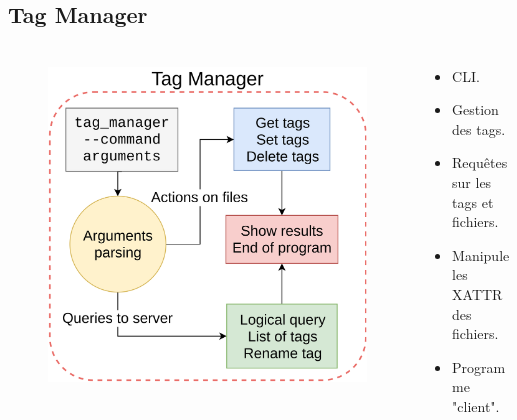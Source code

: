 \documentclass[10pt]{beamer}
\begin{document}
\subsection{Tag Manager}
\begin{frame}
    \frametitle{\subsecname}
    \begin{columns}[T]
        \begin{column}{.5\textwidth}
            \begin{center}
                \begin{figure}
                    \includegraphics[width=1\textwidth]{images/tag_manager2.png}
                \end{figure}
            \end{center}
        \end{column}
        \pause
        \begin{column}{.5\textwidth}
            \begin{itemize}
                \item CLI.
                \item Gestion des tags.
                \item Requêtes sur les tags et fichiers.
                \item Manipule les XATTR des fichiers.
                \item Programme "client".
            \end{itemize}
        \end{column}
    \end{columns}
\end{frame}
\end{document}
